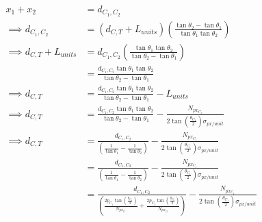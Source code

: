 \documentclass{article}
\begin{document}
	\begin{align}
	x_{1} + x_{2} &= d_{C_{1}, C_{2}} \\
	\implies d_{C_{1}, C_{2}} &= \left(d_{C, T} + L_{units}\right) \left(\frac{\tan \theta_{2} - \tan \theta_{1}}{\tan \theta_{1} \tan \theta_{2}}\right) \\
	\implies d_{C, T} + L_{units} &= d_{C_{1}, C_{2}} \left(\frac{\tan \theta_{1} \tan \theta_{2}}{\tan \theta_{2} - \tan \theta_{1}}\right) \\
	&= \frac{d_{C_{1}, C_{2}} \tan \theta_{1} \tan \theta_{2}}{\tan \theta_{2} - \tan \theta_{1}} \\
	\implies d_{C, T} &= \frac{d_{C_{1}, C_{2}} \tan \theta_{1} \tan \theta_{2}}{\tan \theta_{2} - \tan \theta_{1}} - L_{units} \\
	\implies d_{C, T} &= \frac{d_{C_{1}, C_{2}} \tan \theta_{1} \tan \theta_{2}}{\tan \theta_{2} - \tan \theta_{1}} - \frac{N_{px_{C_{1}}}}{2 \tan \left(\frac{\theta_{C_{1}}}{2}\right) \sigma_{px / unit}} \\
	\implies d_{C, T} &= \frac{d_{C_{1}, C_{2}}}{\left(\frac{1}{\tan \theta_{1}} - \frac{1}{\tan \theta_{2}}\right)} - \frac{N_{px_{C_{1}}}}{2 \tan \left(\frac{\theta_{C_{1}}}{2}\right) \sigma_{px / unit}} \\
	&= \frac{d_{C_{1}, C_{2}}}{\left(\frac{1}{\tan \theta_{1}} - \frac{1}{\tan \theta_{2}}\right)} - \frac{N_{px_{C_{1}}}}{2 \tan \left(\frac{\theta_{C_{1}}}{2}\right) \sigma_{px / unit}} \\
	&= \frac{d_{C_{1}, C_{2}}}{\left(\frac{2 p_{C_{1}} \tan \left(\frac{\theta_{C_{1}}}{2}\right)}{N_{px_{C_{1}}}} + \frac{2 p_{C_{2}} \tan \left(\frac{\theta_{C_{2}}}{2}\right)}{N_{px_{C_{2}}}}\right)} - \frac{N_{px_{C_{1}}}}{2 \tan \left(\frac{\theta_{C_{1}}}{2}\right) \sigma_{px / unit}}
	\end{align}
	
\end{document}
